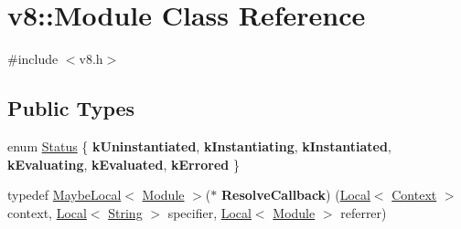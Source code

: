\hypertarget{classv8_1_1Module}{}\section{v8\+:\+:Module Class Reference}
\label{classv8_1_1Module}


{\ttfamily \#include $<$v8.\+h$>$}

\subsection*{Public Types}
\begin{DoxyCompactItemize}
\item 
enum \mbox{\hyperlink{classv8_1_1Module_a9c2a22c9cb8e928d570c38648c648b7e}{Status}} \{ \newline
{\bfseries k\+Uninstantiated}, 
{\bfseries k\+Instantiating}, 
{\bfseries k\+Instantiated}, 
{\bfseries k\+Evaluating}, 
\newline
{\bfseries k\+Evaluated}, 
{\bfseries k\+Errored}
 \}
\item 
\mbox{\label{classv8_1_1Module_a49b31b9f2408284c0ce3c622b5e29027}} 
typedef \mbox{\hyperlink{classv8_1_1MaybeLocal}{Maybe\+Local}}$<$ \mbox{\hyperlink{classv8_1_1Module}{Module}} $>$($\ast$ {\bfseries Resolve\+Callback}) (\mbox{\hyperlink{classv8_1_1Local}{Local}}$<$ \mbox{\hyperlink{classv8_1_1Context}{Context}} $>$ context, \mbox{\hyperlink{classv8_1_1Local}{Local}}$<$ \mbox{\hyperlink{classv8_1_1String}{String}} $>$ specifier, \mbox{\hyperlink{classv8_1_1Local}{Local}}$<$ \mbox{\hyperlink{classv8_1_1Module}{Module}} $>$ referrer)
\end{DoxyCompactItemize}
